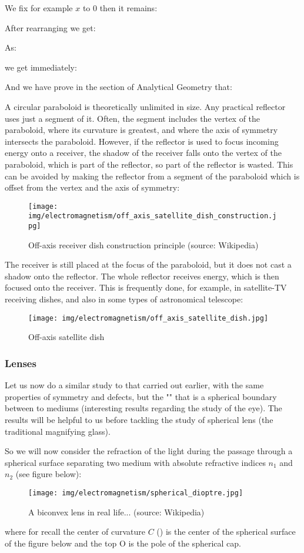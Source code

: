 	We fix for example $x$ to $0$ then it remains:
	
	After rearranging we get:
	
	As:
	
	we get immediately:
	
	And we have prove in the section of Analytical Geometry that:
	
	A circular paraboloid is theoretically unlimited in size. Any practical reflector uses just a segment of it. Often, the segment includes the vertex of the paraboloid, where its curvature is greatest, and where the axis of symmetry intersects the paraboloid. However, if the reflector is used to focus incoming energy onto a receiver, the shadow of the receiver falls onto the vertex of the paraboloid, which is part of the reflector, so part of the reflector is wasted. This can be avoided by making the reflector from a segment of the paraboloid which is offset from the vertex and the axis of symmetry:
	\begin{figure}[H]
		\centering
		\texttt{[image: img/electromagnetism/off\_axis\_satellite\_dish\_construction.jpg]}	
		\caption[]{Off-axis receiver dish construction principle (source: Wikipedia)}
	\end{figure}
	The receiver is still placed at the focus of the paraboloid, but it does not cast a shadow onto the reflector. The whole reflector receives energy, which is then focused onto the receiver. This is frequently done, for example, in satellite-TV receiving dishes, and also in some types of astronomical telescope:
	\begin{figure}[H]
		\centering
		\texttt{[image: img/electromagnetism/off\_axis\_satellite\_dish.jpg]}	
		\caption{Off-axis satellite dish}
	\end{figure}
	
	\pagebreak
	\subsubsection{Lenses}
	Let us now do a similar study to that carried out earlier, with the same properties of symmetry and defects, but the "" that is a spherical boundary between to mediums (interesting results regarding the study of the eye). The results will be helpful to us before tackling the study of spherical lens (the traditional magnifying glass).
	
	So we will now consider the refraction of the light during the passage through a spherical surface separating two medium with absolute refractive indices $n_1$ and $n_2$ (see figure below):
	\begin{figure}[H]
		\centering
		\texttt{[image: img/electromagnetism/spherical\_dioptre.jpg]}
		\caption{A biconvex lens in real life... (source: Wikipedia)}
	\end{figure}
	where for recall the center of curvature $C$  () is the center of the spherical surface of the figure below and the top O is the pole of the spherical cap.

